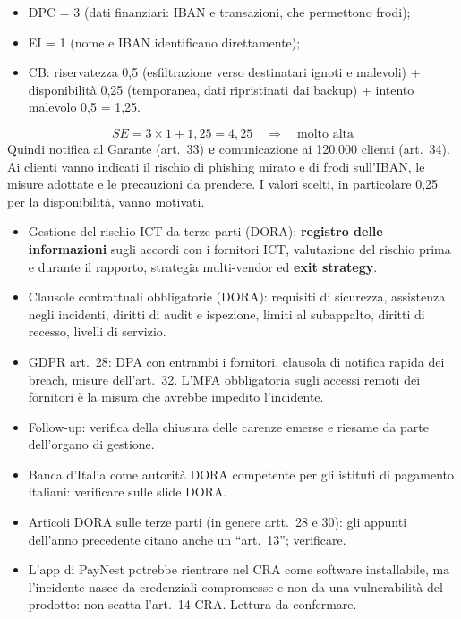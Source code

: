 \begin{soluzione}
\begin{itemize}
  \item DPC = 3 (dati finanziari: IBAN e transazioni, che permettono frodi);
  \item EI = 1 (nome e IBAN identificano direttamente);
  \item CB: riservatezza 0,5 (esfiltrazione verso destinatari ignoti e malevoli) + disponibilità 0,25
    (temporanea, dati ripristinati dai backup) + intento malevolo 0,5 = 1,25.
\end{itemize}
\[
SE = 3 \times 1 + 1{,}25 = 4{,}25 \quad\Rightarrow\quad \text{molto alta}
\]
Quindi notifica al Garante (art.~33) \textbf{e} comunicazione ai 120.000 clienti (art.~34). Ai clienti
vanno indicati il rischio di phishing mirato e di frodi sull'IBAN, le misure adottate e le precauzioni
da prendere. I valori scelti, in particolare 0,25 per la disponibilità, vanno motivati.
\end{soluzione}

\begin{soluzione}
\begin{itemize}
  \item Gestione del rischio ICT da terze parti (DORA): \textbf{registro delle informazioni} sugli
    accordi con i fornitori ICT, valutazione del rischio prima e durante il rapporto, strategia
    multi-vendor ed \textbf{exit strategy}.
  \item Clausole contrattuali obbligatorie (DORA): requisiti di sicurezza, assistenza negli incidenti,
    diritti di audit e ispezione, limiti al subappalto, diritti di recesso, livelli di servizio.
  \item GDPR art.~28: DPA con entrambi i fornitori, clausola di notifica rapida dei breach, misure
    dell'art.~32. L'MFA obbligatoria sugli accessi remoti dei fornitori è la misura che avrebbe impedito
    l'incidente.
  \item Follow-up: verifica della chiusura delle carenze emerse e riesame da parte dell'organo di gestione.
\end{itemize}
\end{soluzione}

\begin{verifica}
\begin{itemize}
  \item Banca d'Italia come autorità DORA competente per gli istituti di pagamento italiani: verificare
    sulle slide DORA.
  \item Articoli DORA sulle terze parti (in genere artt.~28 e 30): gli appunti dell'anno precedente
    citano anche un ``art.~13''; verificare.
  \item L'app di PayNest potrebbe rientrare nel CRA come software installabile, ma l'incidente nasce da
    credenziali compromesse e non da una vulnerabilità del prodotto: non scatta l'art.~14 CRA.
    Lettura da confermare.
\end{itemize}
\end{verifica}

